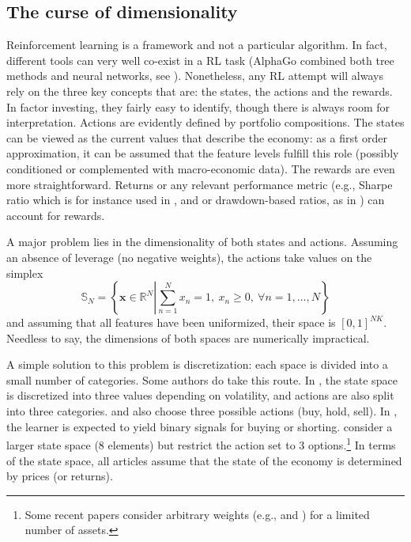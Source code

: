 \documentclass[]{krantz}
\let\rmarkdownfootnote\footnote%
\def\footnote{\protect\rmarkdownfootnote}
\theoremstyle{definition}
\theoremstyle{definition}
\theoremstyle{definition}
\theoremstyle{remark}
\begin{document}
\hypertarget{the-curse-of-dimensionality}{%
\subsection{The curse of
dimensionality}\label{the-curse-of-dimensionality}}

Reinforcement learning is a framework and not a particular algorithm. In
fact, different tools can very well co-exist in a RL task (AlphaGo
combined both tree methods and neural networks, see
\citet{silver2016mastering}). Nonetheless, any RL attempt will always
rely on the three key concepts that are: the states, the actions and the
rewards. In factor investing, they fairly easy to identify, though there
is always room for interpretation. Actions are evidently defined by
portfolio compositions. The states can be viewed as the current values
that describe the economy: as a first order approximation, it can be
assumed that the feature levels fulfill this role (possibly conditioned
or complemented with macro-economic data). The rewards are even more
straightforward. Returns or any relevant performance metric (e.g.,
Sharpe ratio which is for instance used in \citet{moody1998performance},
\citet{bertoluzzo2012testing} and \citet{aboussalah2020continuous} or
drawdown-based ratios, as in \citet{almahdi2017adaptive}) can account
for rewards.

A major problem lies in the dimensionality of both states and actions.
Assuming an absence of leverage (no negative weights), the actions take
values on the simplex \begin{equation}
\label{eq:simplex}
\mathbb{S}_N=\left\{ \mathbf{x} \in \mathbb{R}^N\left|\sum_{n=1}^Nx_n=1, \ x_n\ge 0, \ \forall n=1,\dots,N \right.\right\}
\end{equation} and assuming that all features have been uniformized,
their space is \([0,1]^{NK}\). Needless to say, the dimensions of both
spaces are numerically impractical.

A simple solution to this problem is discretization: each space is
divided into a small number of categories. Some authors do take this
route. In \citet{yang2018investor}, the state space is discretized into
three values depending on volatility, and actions are also split into
three categories. \citet{bertoluzzo2012testing} and
\citet{xiong2018practical} also choose three possible actions (buy,
hold, sell). In \citet{almahdi2019constrained}, the learner is expected
to yield binary signals for buying or shorting.
\citet{garcia2019continuous} consider a larger state space (8 elements)
but restrict the action set to 3 options.\footnote{Some recent papers
  consider arbitrary weights (e.g., \citet{jiang2017deep} and
  \citet{yu2019model}) for a limited number of assets.} In terms of the
state space, all articles assume that the state of the economy is
determined by prices (or returns).
\end{document}
